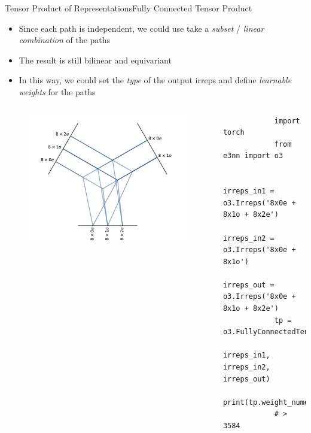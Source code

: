 \documentclass[pdf,serif]{beamer}
\newcommand{\empr}[1]{{\color{BerkeleyBlue}\emph{#1}}}
\begin{document}
\begin{frame}[fragile]{Tensor Product of Representations}{Fully Connected Tensor Product}
    \begin{itemize}
        \item Since each path is independent, we could use take a \empr{subset} / \empr{linear combination} of the paths
        \item The result is still bilinear and equivariant
        \item In this way, we could set the \empr{type} of the output irreps and define \empr{learnable weights} for the paths
    \end{itemize}
    \begin{columns}
        \begin{figure}
            \includegraphics[width=\linewidth]{images/fulltp3.pdf}
        \end{figure}
        \begin{verbatim}
            import torch
            from e3nn import o3

            irreps_in1 = o3.Irreps('8x0e + 8x1o + 8x2e') 
            irreps_in2 = o3.Irreps('8x0e + 8x1o')
            irreps_out = o3.Irreps('8x0e + 8x1o + 8x2e')
            tp = o3.FullyConnectedTensorProduct(
                irreps_in1, irreps_in2, irreps_out)
            print(tp.weight_numel)
            # > 3584
        \end{verbatim}
        \vspace*{1em}
    \end{columns}
\end{frame}
\end{document}
